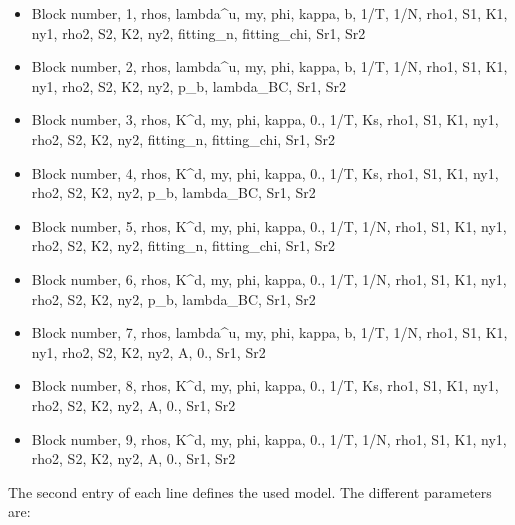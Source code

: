 			\begin{itemize}	    
\item Block number, 1, rhos, lambda\^{}u, my, phi, kappa, b,  1/T, 1/N, rho1, S1, K1, ny1, rho2, S2, K2, ny2, fitting\_n, fitting\_chi, Sr1, Sr2
\item Block number, 2, rhos, lambda\^{}u, my, phi, kappa, b,  1/T, 1/N, rho1, S1, K1, ny1, rho2, S2, K2, ny2, p\_b,       lambda\_BC,   Sr1, Sr2
\item Block number, 3, rhos, K\^{}d,      my, phi, kappa, 0., 1/T, Ks,  rho1, S1, K1, ny1, rho2, S2, K2, ny2, fitting\_n, fitting\_chi, Sr1, Sr2
\item Block number, 4, rhos, K\^{}d,      my, phi, kappa, 0., 1/T, Ks,  rho1, S1, K1, ny1, rho2, S2, K2, ny2, p\_b,       lambda\_BC,   Sr1, Sr2
\item Block number, 5, rhos, K\^{}d,      my, phi, kappa, 0., 1/T, 1/N, rho1, S1, K1, ny1, rho2, S2, K2, ny2, fitting\_n, fitting\_chi, Sr1, Sr2
\item Block number, 6, rhos, K\^{}d,      my, phi, kappa, 0., 1/T, 1/N, rho1, S1, K1, ny1, rho2, S2, K2, ny2, p\_b,       lambda\_BC,   Sr1, Sr2
\item Block number, 7, rhos, lambda\^{}u, my, phi, kappa, b,  1/T, 1/N, rho1, S1, K1, ny1, rho2, S2, K2, ny2, A,         0.,          Sr1, Sr2
\item Block number, 8, rhos, K\^{}d,      my, phi, kappa, 0., 1/T, Ks,  rho1, S1, K1, ny1, rho2, S2, K2, ny2, A,         0.,          Sr1, Sr2
\item Block number, 9, rhos, K\^{}d,      my, phi, kappa, 0., 1/T, 1/N, rho1, S1, K1, ny1, rho2, S2, K2, ny2, A,         0.,          Sr1, Sr2
\end{itemize} 		    
		    The second entry of each line defines the used model. The different parameters are: 
